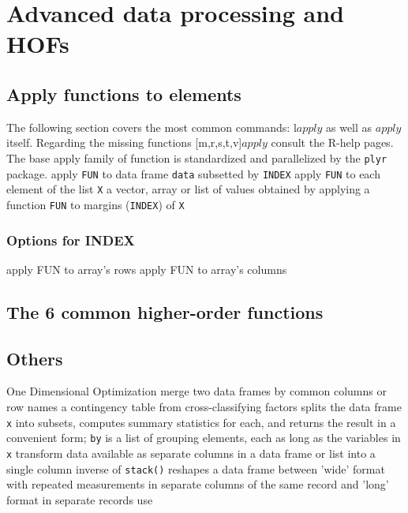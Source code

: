 \section{Advanced data processing and HOFs}{}
\subsection{Apply functions to elements}{The following section covers the most
common commands: l$apply$ as well as $apply$ itself. Regarding the
missing functions [m,r,s,t,v]$apply$ consult the R-help pages. The base apply
family of function is standardized and parallelized by the {\tt plyr} package.}
	{apply {\tt FUN} to data frame {\tt data} subsetted by {\tt INDEX}}
	{apply {\tt FUN} to each element of the list {\tt X}}
	{a vector, array or list of values obtained by applying a function {\tt FUN} to margins ({\tt INDEX}) of {\tt X}}
\subsubsection{Options for INDEX}{}
	{apply FUN to array's rows}
	{apply FUN to array's columns}

\subsection{The 6 common higher-order functions}{}

\subsection{Others}{}
	{One Dimensional Optimization}
	{merge two data frames by com\-mon col\-umns or row names}
	{a contingency table from cross-classi\-fy\-ing factors}
	{splits the data frame {\tt x} into subsets,
computes summary statistics for each, and returns the result in a convenient
form; {\tt by} is a list of grouping elements, each as long as the variables in
{\tt x}}
	{transform data available as se\-pa\-rate col\-umns in
a data frame or list into a single column}
	{inverse of {\tt stack()}}
	{reshapes a data frame between 'wide' format
    with re\-pea\-ted mea\-sure\-ments in separate
    columns of the same record and 'long' format in separate records}
	{use}

